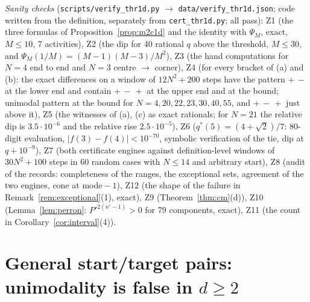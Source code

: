 \documentclass[11pt,a4paper]{article}
\theoremstyle{definition}
\begin{document}
\emph{Sanity checks} (\texttt{scripts/verify\_thr1d.py} $\to$ \texttt{data/verify\_thr1d.json}; code written from the definition, separately from \texttt{cert\_thr1d.py}; all pass): Z1 (the three formulas of Proposition~\ref{prop:m2c1d} and the identity with $\Psi_M$, exact, $M\le10$, 7 activities), Z2 (the dip for 40 rational $q$ above the threshold, $M\le30$, and $\Psi_M(1/M)=(M-1)(M-3)/M^2$), Z3 (the hand computations for $N=4$ end to end and $N=3$ centre $\to$ corner), Z4 (for every bracket of (a) and (b): the exact differences on a window of $12N^2+200$ steps have the pattern $+\,-$ at the lower end and contain $+\,-\,+$ at the upper end and at the bound; unimodal pattern at the bound for $N=4,20,22,23,30,40,55$, and $+\,-\,+$ just above it), Z5 (the witnesses of (a), (c) as exact rationals; for $N=21$ the relative dip is $3.5\cdot10^{-6}$ and the relative rise $2.5\cdot10^{-5}$), Z6 ($q^*(5)=(4+\sqrt2)/7$: 80-digit evaluation, $|f(3)-f(4)|<10^{-70}$, symbolic verification of the tie, dip at $q+10^{-9}$), Z7 (both certificate engines against definition-level windows of $30N^2+100$ steps in 60 random cases with $N\le14$ and arbitrary start), Z8 (audit of the records: completeness of the ranges, the exceptional sets, agreement of the two engines, cone at mode${}-1$), Z12 (the shape of the failure in Remark~\ref{rem:exceptional}(1), exact), Z9 (Theorem~\ref{thm:cm}(d)), Z10 (Lemma~\ref{lem:perron}: $P'^{2(n'-1)}>0$ for 79 components, exact), Z11 (the count in Corollary~\ref{cor:interval}(4)).

\section{General start/target pairs: unimodality is false in $d\ge2$}\label{sec:counter}
\end{document}
